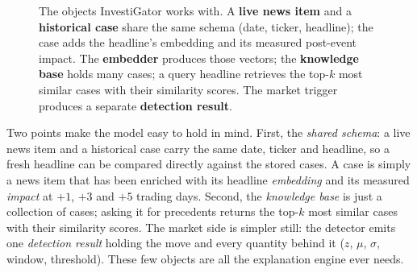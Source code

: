 \begin{figure}[ht]
\centering
{}
\caption[InvestiGator's data model]{The objects InvestiGator works with. A \textbf{live news item} and a
\textbf{historical case} share the same schema (date, ticker, headline); the case adds the headline's
embedding and its measured post-event impact. The \textbf{embedder} produces those vectors; the
\textbf{knowledge base} holds many cases; a query headline retrieves the top-$k$ most similar cases with
their similarity scores. The market trigger produces a separate \textbf{detection result}.}
\label{fig:datamodel}
\end{figure}

Two points make the model easy to hold in mind. First, the \emph{shared schema}: a live news item and a
historical case carry the same date, ticker and headline, so a fresh headline can be compared directly
against the stored cases. A case is simply a news item that has been enriched with its headline
\emph{embedding} and its measured \emph{impact} at $+1$, $+3$ and $+5$ trading days. Second, the
\emph{knowledge base} is just a collection of cases; asking it for precedents returns the top-$k$ most
similar cases with their similarity scores. The market side is simpler still: the detector emits one
\emph{detection result} holding the move and every quantity behind it ($z$, $\mu$, $\sigma$, window,
threshold). These few objects are all the explanation engine ever needs.

